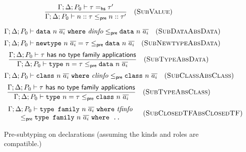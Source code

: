 \begin{figure}
\[
\frac{
\Gamma; \Delta; P_0 \vdash \tau =_\textsf{hs} \tau'
}{
\Gamma; \Delta; P_0 \vdash n :: \tau \le_\textsf{pre} n :: \tau'
}
\quad(\textsc{SubValue})
\]


\begin{mdframed}
\[
\Gamma; \Delta; P_0 \vdash \texttt{data}~n~\overline{a_i} ~\texttt{where}~ \mathit{dinfo} \le_\textsf{pre} \texttt{data}~n~\overline{a_i}
\quad(\textsc{SubDataAbsData})
\]
\[
\Gamma; \Delta; P_0 \vdash \texttt{newtype}~n~\overline{a_i} = \tau \le_\textsf{pre} \texttt{data}~n~\overline{a_i}
\quad(\textsc{SubNewtypeAbsData})
\]
\[
\frac{
\Gamma; \Delta; P_0 \vdash \tau ~\textsf{has no type family applications}
}{
\Gamma; \Delta; P_0 \vdash \texttt{type}~n = \tau \le_\textsf{pre} \texttt{data}~n~\overline{a_i}
}
\quad(\textsc{SubTypeAbsData})
\]
\[
\Gamma; \Delta; P_0 \vdash \texttt{class}~n~\overline{a_i}~\texttt{where}~ \mathit{clinfo} \le_\textsf{pre} \texttt{class}~n~\overline{a_i}
\quad(\textsc{SubClassAbsClass})
\]
\[
\frac{
\Gamma; \Delta; P_0 \vdash \tau ~\textsf{has no type family applications}
}{
\Gamma; \Delta; P_0 \vdash \texttt{type}~n = \tau \le_\textsf{pre} \texttt{class}~n~\overline{a_i}
}
\quad(\textsc{SubTypeAbsClass})
\]
\[
\begin{array}{c}
\Gamma; \Delta; P_0 \vdash \texttt{type family}~n~\overline{a_i} ~\texttt{where}~ \mathit{tfinfo} \\
\le_\textsf{pre} \texttt{type family}~n~\overline{a_i} ~\texttt{where ..}
\end{array}
\quad(\textsc{SubClosedTFAbsClosedTF})
\]
\end{mdframed}
\caption{Pre-subtyping on declarations (assuming the kinds and roles are compatible.)}
\label{typing:subtyping}
\end{figure}
